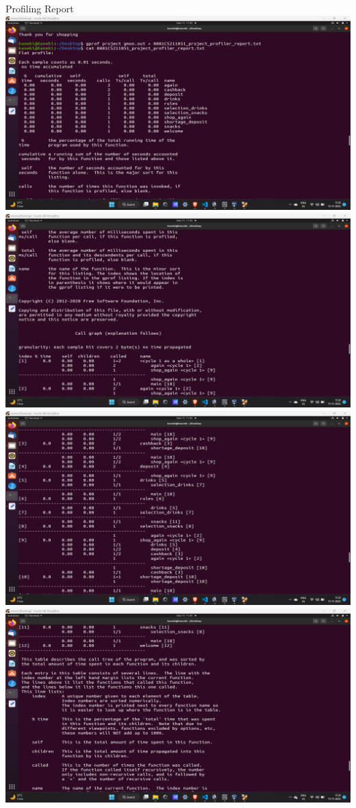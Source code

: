 \documentclass[10pt,a4paper]{article}
\begin{document}
\begin{flushleft}
\newpage
\begin{center}
Profiling Report\\
\bigskip
\includegraphics[scale=0.3]{report1}\\
\bigskip
\includegraphics[scale=0.3]{report2}\\
\bigskip
\includegraphics[scale=0.3]{report3}\\
\bigskip
\includegraphics[scale=0.3]{report4}\\

\end{center}
\end{flushleft}
\end{document}
